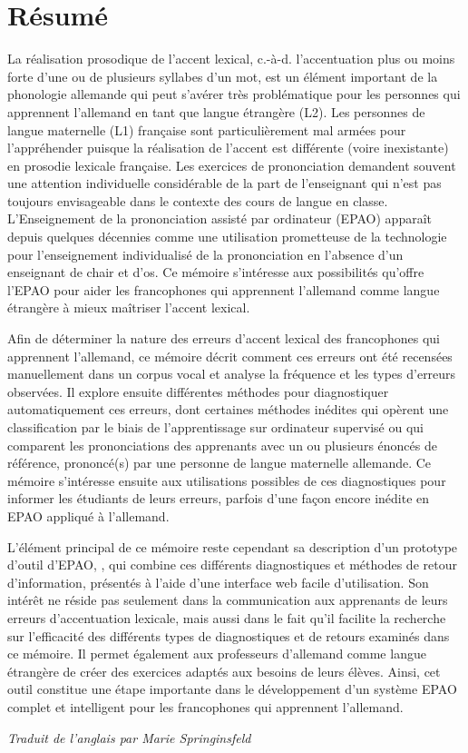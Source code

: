 %
\chapter*{Résumé}
\label{sec:abstract:fr}
\vspace*{-10mm}

La réalisation prosodique de l'accent lexical, c.-à-d. l'accentuation plus ou moins forte d'une ou de plusieurs syllabes d'un mot, est un élément important de la phonologie allemande qui peut s'avérer très problématique pour les personnes qui apprennent l'allemand en tant que langue étrangère (L2). Les personnes de langue maternelle (L1) française sont particulièrement mal armées pour l'appréhender puisque la réalisation de l'accent est différente (voire inexistante) en prosodie lexicale française. Les exercices de prononciation demandent souvent une attention individuelle considérable de la part de l'enseignant qui n'est pas toujours envisageable dans le contexte des cours de langue en classe. L'Enseignement de la prononciation assisté par ordinateur (EPAO) apparaît depuis quelques décennies comme une utilisation prometteuse de la technologie pour l'enseignement individualisé de la prononciation en l'absence d'un enseignant de chair et d'os. Ce mémoire s'intéresse aux possibilités qu'offre l'EPAO pour aider les francophones qui apprennent l'allemand comme langue étrangère à mieux maîtriser l'accent lexical.

Afin de déterminer la nature des erreurs d'accent lexical des francophones qui apprennent l'allemand, ce mémoire décrit comment ces erreurs ont été recensées manuellement dans un corpus vocal et analyse la fréquence et les types d'erreurs observées. Il explore ensuite différentes méthodes pour diagnostiquer automatiquement ces erreurs, dont certaines méthodes inédites qui opèrent une classification par le biais de l'apprentissage sur ordinateur supervisé ou qui comparent les prononciations des apprenants avec un ou plusieurs énoncés de référence, prononcé(s) par une personne de langue maternelle allemande. Ce mémoire s'intéresse ensuite aux utilisations possibles de ces diagnostiques pour informer les étudiants de leurs erreurs, parfois d'une façon encore inédite en EPAO appliqué à l'allemand.

L'élément principal de ce mémoire reste cependant sa description d'un prototype d'outil d'EPAO, , qui combine ces différents diagnostiques et méthodes de retour d'information, présentés à l'aide d'une interface web facile d'utilisation. Son intérêt ne réside pas seulement dans la communication aux apprenants  de leurs erreurs d'accentuation lexicale, mais aussi dans le fait qu'il facilite la recherche sur l'efficacité des différents types de diagnostiques et de retours examinés dans ce mémoire. Il permet également aux professeurs d'allemand comme langue étrangère de créer des exercices adaptés aux besoins de leurs élèves. Ainsi, cet outil constitue une étape importante dans le développement d'un système EPAO complet et intelligent pour les francophones qui apprennent l'allemand.

\begin{flushright}
\textit{Traduit de l'anglais par Marie Springinsfeld}
\end{flushright}